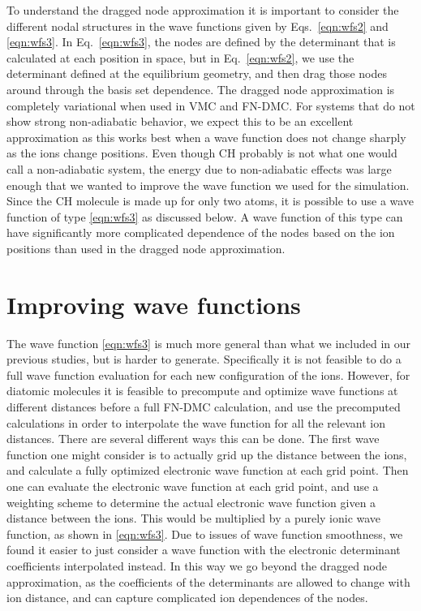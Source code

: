 \documentclass[aip,jcp,numerical,reprint]{revtex4-1}
\begin{document}
To understand the dragged node approximation  it is important to consider the different nodal structures in the wave functions given by Eqs.~\eqref{eqn:wfs2} and \eqref{eqn:wfs3}.  In Eq.~\eqref{eqn:wfs3}, the nodes are defined by the determinant that is calculated at each position in space, but in Eq.~\eqref{eqn:wfs2}, we use the determinant defined at the equilibrium geometry, and then drag those nodes around through the basis set dependence.   The dragged node approximation is completely variational when used in VMC and FN-DMC.  
For systems that do not show strong non-adiabatic behavior, we expect this to be an excellent approximation as this works best when a wave function does not change sharply as the ions change positions.   Even though CH probably is not what one would call a non-adiabatic system, the energy due to non-adiabatic effects was large enough that we wanted to improve the wave function we used for the simulation.    Since the CH molecule is made up for only two atoms, it is possible to use a wave function of type \eqref{eqn:wfs3} as discussed below.   A wave function of this type can have significantly more complicated dependence of the nodes based on the ion positions than used in the dragged node approximation.

\section{Improving wave functions}

The wave function \eqref{eqn:wfs3} is much more general than what we included in our previous studies, but is harder to generate.  Specifically it is not feasible to do a full wave function evaluation for each new configuration of the ions.  However, for diatomic molecules it is feasible to precompute and optimize wave functions at different distances before a full FN-DMC calculation, and use the precomputed calculations in order to interpolate the wave function for all the relevant ion distances.  There are several different ways this can be done.   The first wave function one might consider is to actually grid up the distance between the ions, and calculate a fully optimized electronic wave function at each grid point.  Then one can evaluate the electronic wave function at each grid point, and use a weighting scheme to determine the actual electronic wave function given a distance between the ions.  This would be multiplied by a purely ionic wave function, as shown in \eqref{eqn:wfs3}.  Due to issues of wave function smoothness, we found it easier to just consider a wave function with the electronic determinant coefficients interpolated instead.  In this way we go beyond the dragged node approximation, as the coefficients of the determinants are allowed to change with ion distance, and can capture complicated ion dependences of the nodes.
\end{document}
